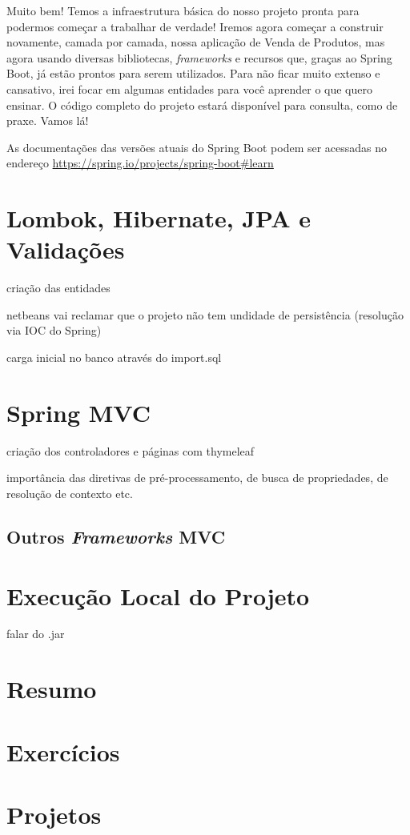 Muito bem! Temos a infraestrutura básica do nosso projeto pronta para podermos começar a trabalhar de verdade! Iremos agora começar a construir novamente, camada por camada, nossa aplicação de Venda de Produtos, mas agora usando diversas bibliotecas, \textit{frameworks} e recursos que, graças ao Spring Boot, já estão prontos para serem utilizados. Para não ficar muito extenso e cansativo, irei focar em algumas entidades para você aprender o que quero ensinar. O código completo do projeto estará disponível para consulta, como de praxe. Vamos lá!

\begin{saibaMais}
    As documentações das versões atuais do Spring Boot podem ser acessadas no endereço \url{https://spring.io/projects/spring-boot#learn}
\end{saibaMais}

\section{Lombok, Hibernate, JPA e Validações}

criação das entidades

netbeans vai reclamar que o projeto não tem undidade de persistência (resolução via IOC do Spring)

carga inicial no banco através do import.sql


\section{Spring MVC}

criação dos controladores e páginas com thymeleaf

importância das diretivas de pré-processamento, de busca de propriedades, de resolução de contexto etc.

\subsection{Outros \textit{Frameworks} MVC}


\section{Execução Local do Projeto}

falar do .jar


\section{Resumo}

\section{Exercícios}

\section{Projetos}
